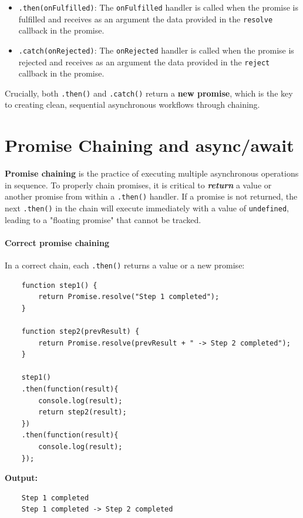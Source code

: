 \documentclass{scrbook}
\begin{document}
\begin{itemize}
    \item
    \texttt{.then(onFulfilled)}: The \texttt{onFulfilled} handler is called when the promise is fulfilled and receives as an argument the data provided in the \texttt{resolve} callback in the promise.
    
    \item
    \texttt{.catch(onRejected)}: The \texttt{onRejected} handler is called when the promise is rejected and receives as an argument the data provided in the \texttt{reject} callback in the promise.
\end{itemize}

Crucially, both \texttt{.then()} and \texttt{.catch()} return a \textbf{new promise}, which is the key to creating clean, sequential asynchronous workflows through chaining.

\section{Promise Chaining and async/await}

\textbf{Promise chaining} is the practice of executing multiple asynchronous operations in sequence. To properly chain promises, it is critical to \textit{\textbf{return}} a value or another promise from within a \texttt{.then()} handler. If a promise is not returned, the next \texttt{.then()} in the chain will execute immediately with a value of \texttt{undefined}, leading to a "floating promise" that cannot be tracked.

\paragraph{Correct promise chaining}

In a correct chain, each \texttt{.then()} returns a value or a new promise:

\begin{lstlisting}
    function step1() {
        return Promise.resolve("Step 1 completed");
    }
    
    function step2(prevResult) {
        return Promise.resolve(prevResult + " -> Step 2 completed");
    }
    
    step1()
    .then(function(result){
        console.log(result);
        return step2(result);
    })
    .then(function(result){
        console.log(result);
    });
\end{lstlisting}

\textbf{Output:}
\begin{lstlisting}
    Step 1 completed
    Step 1 completed -> Step 2 completed
\end{lstlisting}
\end{document}
